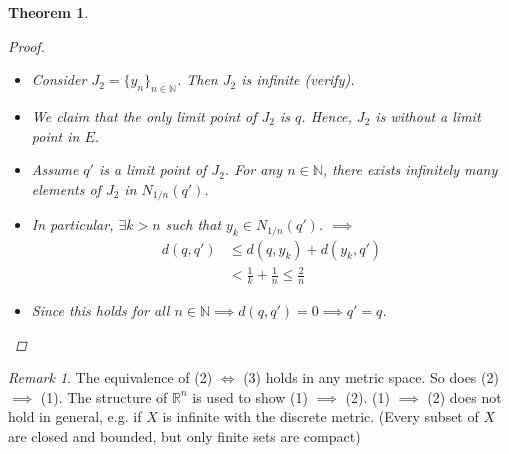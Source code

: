 \documentclass[10pt]{article}
\newcommand{\N}{\mathbb{N}}
\newcommand{\R}{\mathbb{R}}
\newtheorem{theorem}{Theorem}[section]
\theoremstyle{definition}
\theoremstyle{remark}
\newtheorem*{remark}{Remark}
\begin{document}
\begin{theorem}
\begin{proof}
\begin{enumerate}
\begin{itemize}
                \item Consider $J_2 = \{y_n\}_{n \in \N}$. Then $J_2$ is infinite (verify).
                \item We claim that the only limit point of $J_2$ is $q$. Hence, $J_2$ is without a limit point in $E$.
                \item Assume $q'$ is a limit point of $J_2$. For any $n \in \N$, there exists infinitely many elements of $J_2$ in $N_{1/n}(q')$.
                \item In particular, $\exists  k > n$ such that $y_k \in N_{1/n}(q')$.
                $\implies$
                    \begin{align*}
                        d(q, q') &\leq d(q, y_k) + d(y_k, q') \\
                        &< \frac{1}{k} + \frac{1}{n} \leq \frac{2}{n}
                    \end{align*}
                \item Since this holds for all $n \in \N \implies d(q, q') = 0 \implies q' = q$.
            \end{itemize}
        \end{enumerate}
    \end{proof}
\end{theorem}

\begin{remark}
    The equivalence of (2) $\iff$ (3) holds in any metric space. So does (2) $\implies$ (1).
    The structure of $\R^n$ is used to show (1) $\implies$ (2).
    (1) $\implies$ (2) does not hold in general, e.g. if $X$ is infinite with the discrete metric. (Every subset of $X$ are closed and bounded, but only finite sets are compact)
\end{remark}
\end{document}

